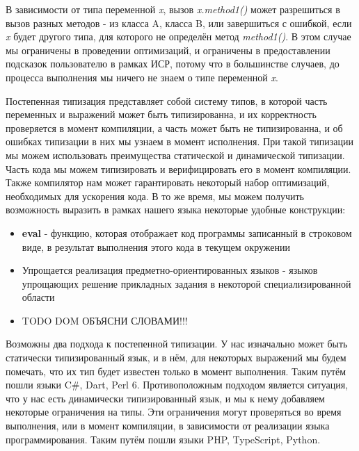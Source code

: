 
В зависимости от типа переменной \textit{x}, вызов \textit{x.method1()} может разрешиться в вызов разных методов - из класса A, класса B, или завершиться с ошибкой, если \textit{x} будет другого типа, для которого не определён метод \textit{method1()}. В этом случае мы ограничены в проведении оптимизаций, и ограничены в предоставлении подсказок пользователю в рамках ИСР, потому что в большинстве случаев, до процесса выполнения мы ничего не знаем о типе переменной \textit{x}.

Постепенная типизация представляет собой систему типов, в которой часть переменных и выражений может быть типизированна, и их корректность проверяется в момент компиляции, а часть может быть не типизированна, и об ошибках типизации в них мы узнаем в момент исполнения. При такой типизации мы можем использовать преимущества статической и динамической типизации. Часть кода мы можем типизировать и верифицировать его в момент компиляции. Также компилятор нам может гарантировать некоторый набор оптимизаций, необходимых для ускорения кода. В то же время, мы можем получить возможность выразить в рамках нашего языка некоторые удобные конструкции:

\begin{itemize}
    \item \textbf{eval} - функцию, которая отображает код программы записанный в строковом виде, в результат выполнения этого кода в текущем окружении
    \item Упрощается реализация предметно-ориентированных языков - языков упрощающих решение прикладных задания в некоторой специализированной области
    \item TODO DOM  ОБЪЯСНИ СЛОВАМИ!!!
\end{itemize}

Возможны два подхода к постепенной типизации. У нас изначально может быть статически типизированный язык, и в нём, для некоторых выражений мы будем помечать, что их тип будет известен только в момент выполнения. Таким путём пошли языки C{\#}, Dart, Perl 6. Противоположным подходом является ситуация, что у нас есть динамически типизированный язык, и мы к нему добавляем некоторые ограничения на типы. Эти ограничения могут проверяться во время выполнения, или в момент компиляции, в зависимости от реализации языка программирования. Таким путём пошли языки PHP, TypeScript, Python.    